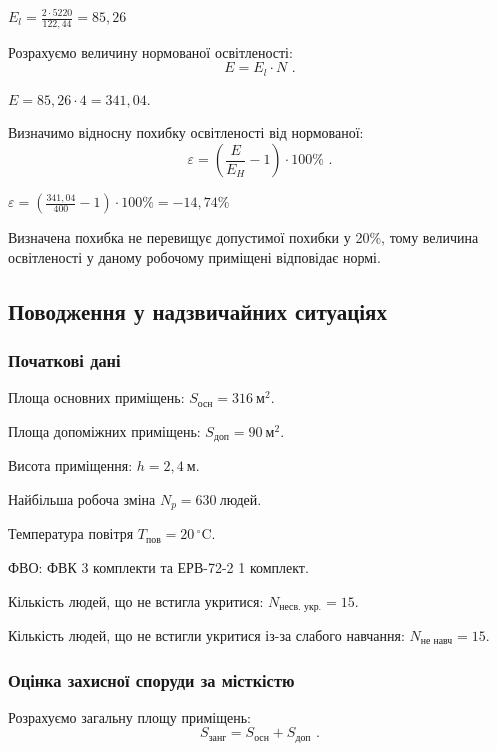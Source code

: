 \documentclass[a4paper,ukrainian,utf8,nocolumnsxix,nocolumnxxxii,nocolumnxxxi,floatsection,equationsection]{eskdtext}
\renewcommand\paragraph{\subsubsection}
\begin{document}
$E_l = \frac{2 \cdot 5220}{122,44} = 85,26$


Розрахуємо величину нормованої освітленості: 
\begin{equation}
	E = E_l \cdot N \text{ .}
\end{equation}

$E = 85,26 \cdot 4 = 341,04$.

Визначимо відносну похибку освітленості від нормованої:
\begin{equation}
	\varepsilon = \left( \frac{E}{E_H} - 1 \right) \cdot 100\% \text{ .}
\end{equation}

$\varepsilon = \left( \frac{341,04}{400} -1 \right) \cdot 100\% = -14,74\%$


Визначена похибка не перевищує допустимої похибки у 20\%, тому величина освітленості у даному робочому приміщені відповідає нормі.

\subsection{Поводження у надзвичайних ситуаціях}

\paragraph{Початкові дані}

Площа основних приміщень: $S_{\text{осн}} = 316\:\text{м}^2$.

Площа допоміжних приміщень: $S_{\text{доп}} = 90\:\text{м}^2$.

Висота приміщення: $h = 2,4\:\text{м}$.

Найбільша робоча зміна $N_p = 630\:\text{людей}$.

Температура повітря $T_{\text{пов}} = 20\,^{\circ}\mathrm{C}$.

ФВО: ФВК 3 комплекти та ЕРВ-72-2 1 комплект.

Кількість людей, що не встигла укритися: $N_{\text{несв. укр.}} = 15$.

Кількість людей, що не встигли укритися із-за слабого навчання: $N_{\text{не навч}} = 15$.

\paragraph{Оцінка захисної споруди за місткістю}

Розрахуємо загальну площу приміщень:
\begin{equation}
	S_{\text{занг}} = S_{\text{осн}} + S_{\text{доп}} \text{ .}
\end{equation}
\end{document}

